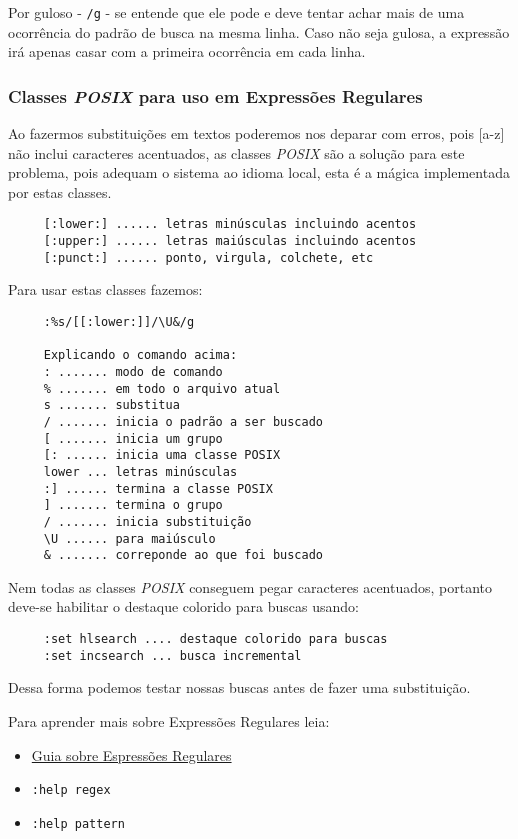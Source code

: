 Por guloso - \verb|/g| - se entende que ele pode e deve tentar achar mais de uma ocorrência
do padrão de busca na mesma linha. Caso não seja gulosa, a expressão irá apenas casar com a
primeira ocorrência em cada linha.

\subsubsection{Classes {\em POSIX} para uso em Expressões Regulares}

Ao fazermos substituições em textos poderemos nos deparar com
erros, pois [a-z] não inclui caracteres acentuados, as classes
{\em POSIX} são a solução para este problema, pois adequam o
sistema ao idioma local, esta é a mágica implementada por estas classes.

\begin{verbatim}
     [:lower:] ...... letras minúsculas incluindo acentos
     [:upper:] ...... letras maiúsculas incluindo acentos
     [:punct:] ...... ponto, virgula, colchete, etc
\end{verbatim}

Para usar estas classes fazemos:

\begin{verbatim}
     :%s/[[:lower:]]/\U&/g

     Explicando o comando acima:
     : ....... modo de comando
     % ....... em todo o arquivo atual
     s ....... substitua
     / ....... inicia o padrão a ser buscado
     [ ....... inicia um grupo
     [: ...... inicia uma classe POSIX
     lower ... letras minúsculas
     :] ...... termina a classe POSIX
     ] ....... termina o grupo
     / ....... inicia substituição
     \U ...... para maiúsculo
     & ....... correponde ao que foi buscado
\end{verbatim}

Nem todas as classes {\em POSIX} conseguem pegar caracteres
acentuados, portanto deve-se habilitar o destaque colorido para
buscas usando:

\begin{verbatim}
     :set hlsearch .... destaque colorido para buscas
     :set incsearch ... busca incremental
\end{verbatim}

Dessa forma podemos testar nossas buscas antes de fazer
uma substituição.


Para aprender mais sobre Expressões Regulares leia:

\begin{itemize}
  \item \href{http://guia-er.sourceforge.net}{Guia sobre Espressões Regulares}
  \item {\tt :help regex}
  \item {\tt :help pattern}
\end{itemize}

